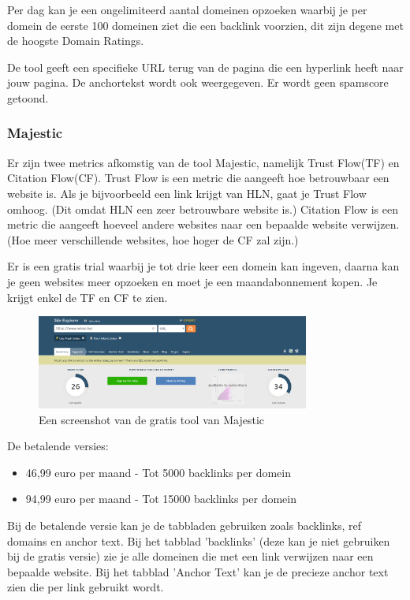 Per dag kan je een ongelimiteerd aantal domeinen opzoeken waarbij je per domein de eerste 100 domeinen ziet die een backlink voorzien, dit zijn degene met de hoogste Domain Ratings.

De tool geeft een specifieke URL terug van de pagina die een hyperlink heeft naar jouw pagina. De anchortekst wordt ook weergegeven. Er wordt geen spamscore getoond. 

\subsubsection{Majestic}
\label{ch: Majestic}
Er zijn twee metrics afkomstig van de tool Majestic, namelijk Trust Flow(TF) en Citation Flow(CF). Trust Flow is een metric die aangeeft hoe betrouwbaar een website is. Als je bijvoorbeeld een link krijgt van HLN, gaat je Trust Flow omhoog. (Dit omdat HLN een zeer betrouwbare website is.) Citation Flow is een metric die aangeeft hoeveel andere websites naar een bepaalde website verwijzen. (Hoe meer verschillende websites, hoe hoger de CF zal zijn.)

Er is een gratis trial waarbij je tot drie keer een domein kan ingeven, daarna kan je geen websites meer opzoeken en moet je een maandabonnement kopen. Je krijgt enkel de TF en CF te zien.

\begin{figure}[h!]
\centering
\includegraphics[width=0.8\textwidth]{img/majesticgratis.PNG}
\caption{Een screenshot van de gratis tool van Majestic
\autocite{majestic}}
\end{figure}

De betalende versies: 
\begin{itemize}
\item 46,99 euro per maand - Tot 5000 backlinks per domein
\item 94,99 euro per maand - Tot 15000 backlinks per domein
\end{itemize}

Bij de betalende versie kan je de tabbladen gebruiken zoals backlinks, ref domains en anchor text. Bij het tabblad 'backlinks' (deze kan je niet gebruiken bij de gratis versie) zie je alle domeinen die met een link verwijzen naar een bepaalde website. Bij het tabblad 'Anchor Text' kan je de precieze anchor text zien die per link gebruikt wordt. 

